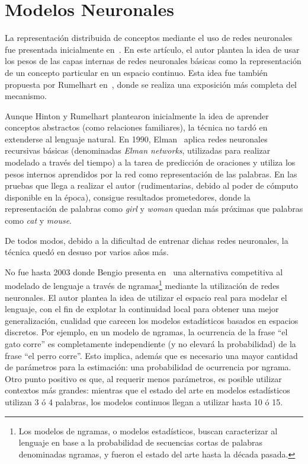 \section{Modelos Neuronales}

La representación distribuida de conceptos mediante el uso de redes neuronales fue presentada
inicialmente en~\cite{Hinton1986}. En este artículo, el autor plantea la idea de usar los pesos de
las capas internas de redes neuronales básicas como la representación de un concepto particular en
un espacio continuo. Esta idea fue también propuesta por Rumelhart en~\cite{Rumelhart1986}, donde se
realiza una exposición más completa del mecanismo.

Aunque Hinton y Rumelhart plantearon inicialmente la idea de aprender conceptos abstractos (como
relaciones familiares), la técnica no tardó en extenderse al lenguaje natural. En 1990,
Elman~\cite{Elman1990} aplica redes neuronales recursivas básicas (denominadas \textit{Elman
networks}, utilizadas para realizar modelado a través del tiempo) a la tarea de predicción de
oraciones y utiliza los pesos internos aprendidos por la red como representación de las palabras. En
las pruebas que llega a realizar el autor (rudimentarias, debido al poder de cómputo disponible en
la época), consigue resultados prometedores, donde la representación de palabras como \textit{girl}
y \textit{woman} quedan más próximas que palabras como \textit{cat} y \textit{mouse}.

De todos modos, debido a la dificultad de entrenar dichas redes neuronales, la técnica quedó en
desuso por varios años más.

No fue hasta 2003 donde Bengio presenta en~\cite{Bengio2003} una alternativa competitiva al modelado
de lenguaje a través de ngramas\footnote{Los modelos de ngramas, o modelos estadísticos, buscan
caracterizar al lenguaje en base a la probabilidad de secuencias cortas de palabras denominadas
ngramas, y fueron el estado del arte hasta la década pasada.} mediante la utilización de redes
neuronales. El autor plantea la idea de utilizar el espacio real para modelar el lenguaje, con el
fin de explotar la continuidad local para obtener una mejor generalización, cualidad que carecen los
modelos estadísticos basados en espacios discretos. Por ejemplo, en un modelo de ngramas, la
ocurrencia de la frase ``el gato corre'' es completamente independiente (y no elevará la
probabilidad) de la frase ``el perro corre''. Esto implica, además que es necesario una mayor
cantidad de parámetros para la estimación: una probabilidad de ocurrencia por ngrama. Otro punto
positivo es que, al requerir menos parámetros, es posible utilizar contextos más grandes: mientras
que el estado del arte en modelos estadísticos utilizan 3 ó 4 palabras, los modelos continuos llegan
a utilizar hasta 10 ó 15.

